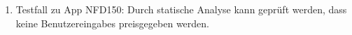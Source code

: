 \begin{enumerate}[label=\textbf{/T\arabic*0/}, align=left]
	\item Testfall zu App NFD150: Durch \gls{statische Analyse} kann geprüft werden, dass keine \Glspl{Benutzereingabe} preisgegeben werden.
\end{enumerate}